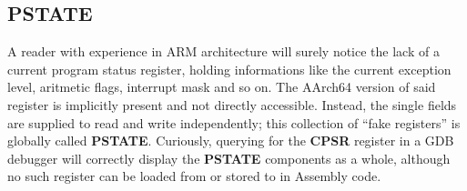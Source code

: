 \documentclass[12pt,a4paper,openright,twoside]{report}
\begin{document}
\subsection{PSTATE}
A reader with experience in ARM architecture will surely notice the lack of a
current program status register, holding informations like the current exception
level, aritmetic flags, interrupt mask and so on.
The AArch64 version of said register is implicitly present and not directly 
accessible. Instead, the single fields are supplied to read and
write independently; this collection of ``fake registers'' is globally called 
\textbf{PSTATE}. Curiously, querying for the \textbf{CPSR} register in a GDB 
debugger will correctly display the \textbf{PSTATE} components as a whole, although
no such register can be loaded from or stored to in Assembly code.
\end{document}
